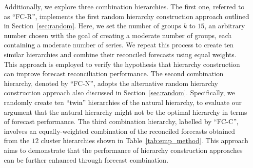 \documentclass[a4paper,review,12pt,authoryear]{elsarticle}
\begin{document}
\begin{table}
\caption{\label{tab:emp_method} Hierarchy construction approaches used in empirical studies.}
\centering
{}
\end{table}

Additionally, we explore three combination hierarchies. The first one, referred to as ``FC-R'', implements the first random hierarchy construction approach outlined in Section~\ref{sec:random}. Here, we set the number of groups $k$ to $15$, an arbitrary number chosen with the goal of creating a moderate number of groups, each containing a moderate number of series.
We repeat this process to create ten similar hierarchies and combine their reconciled forecasts using equal weights.
This approach is employed to verify the hypothesis that hierarchy construction can improve forecast reconciliation performance.
The second combination hierarchy, denoted by ``FC-N'', adopts the alternative random hierarchy construction approach also discussed in Section~\ref{sec:random}. Specifically, we randomly create ten ``twin'' hierarchies of the natural hierarchy, to evaluate our argument that the natural hierarchy might not be the optimal hierarchy in terms of forecast performance.
The third combination hierarchy, labelled by ``FC-C'', involves an equally-weighted combination of the reconciled forecasts obtained from the $12$ cluster hierarchies shown in Table~\ref{tab:emp_method}. This approach aims to demonstrate that the performance of hierarchy construction approaches can be further enhanced through forecast combination.
\end{document}
